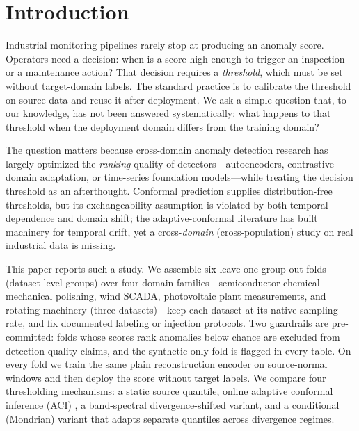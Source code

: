 \section{Introduction}
\label{sec:intro}

Industrial monitoring pipelines rarely stop at producing an anomaly score. Operators need a decision: when is a score high enough to trigger an inspection or a maintenance action? That decision requires a \emph{threshold}, which must be set without target-domain labels. The standard practice is to calibrate the threshold on source data and reuse it after deployment. We ask a simple question that, to our knowledge, has not been answered systematically: what happens to that threshold when the deployment domain differs from the training domain?

The question matters because cross-domain anomaly detection research has largely optimized the \emph{ranking} quality of detectors---autoencoders, contrastive domain adaptation, or time-series foundation models---while treating the decision threshold as an afterthought. Conformal prediction supplies distribution-free thresholds, but its exchangeability assumption is violated by both temporal dependence and domain shift; the adaptive-conformal literature has built machinery for temporal drift, yet a cross-\emph{domain} (cross-population) study on real industrial data is missing.

This paper reports such a study. We assemble six leave-one-group-out folds (dataset-level groups) over four domain families---semiconductor chemical-mechanical polishing, wind SCADA, photovoltaic plant measurements, and rotating machinery (three datasets)---keep each dataset at its native sampling rate, and fix documented labeling or injection protocols. Two guardrails are pre-committed: folds whose scores rank anomalies below chance are excluded from detection-quality claims, and the synthetic-only fold is flagged in every table. On every fold we train the same plain reconstruction encoder on source-normal windows and then deploy the score without target labels. We compare four thresholding mechanisms: a static source quantile, online adaptive conformal inference (ACI) \cite{aci2021}, a band-spectral divergence-shifted variant, and a conditional (Mondrian) variant that adapts separate quantiles across divergence regimes.


